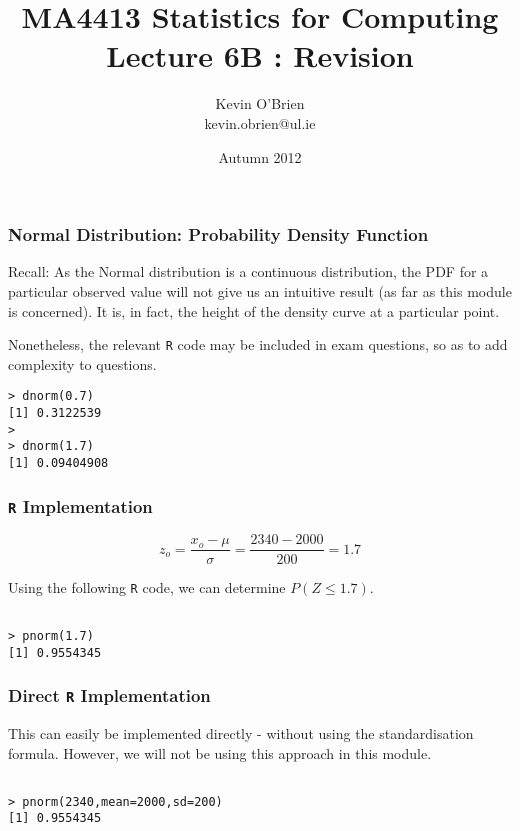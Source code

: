 \documentclass[a4]{beamer}
\title[MA4413]{MA4413 Statistics for Computing \\ {\normalsize Lecture 6B : Revision}}
\author[Kevin O'Brien]{Kevin O'Brien \\ {\scriptsize kevin.obrien@ul.ie}}
\date{Autumn 2012}
\institute[Maths \& Stats]{Dept. of Mathematics \& Statistics, \\ University \textit{of} Limerick}
\begin{document}

\begin{frame}[fragile]
\frametitle{Normal Distribution: Probability Density Function}
Recall: As the Normal distribution is a continuous distribution, the PDF for a particular observed value will not give us an intuitive
result (as far as this module is concerned). It is, in fact, the height of the density curve at a particular point.\\ \bigskip

Nonetheless, the relevant \texttt{R} code may be included in exam questions, so as to add complexity to questions.

\begin{verbatim}
> dnorm(0.7)
[1] 0.3122539
>
> dnorm(1.7)
[1] 0.09404908

\end{verbatim}
\end{frame}

\begin{frame}[fragile]
\frametitle{\texttt{R} Implementation}
\[ z_o = \frac{x_o - \mu}{\sigma}  = \frac{2340-2000}{200} = 1.7\]

Using the following \texttt{R} code, we can determine $P(Z \leq 1.7)$.
\begin{verbatim}

> pnorm(1.7)
[1] 0.9554345

\end{verbatim}
\end{frame}


\begin{frame}[fragile]
\frametitle{Direct \texttt{R} Implementation}

This can easily be implemented directly - without using the standardisation formula.
However, we will not be using this approach in this module.
\begin{verbatim}

> pnorm(2340,mean=2000,sd=200)
[1] 0.9554345


\end{verbatim}
\end{frame}

\end{document}
